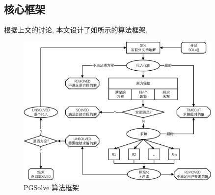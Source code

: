 \subsection{核心框架}

根据上文的讨论, 本文设计了如所示的算法框架. 

\begin{figure}[htbp]
\centering 
\includegraphics[width=0.9\textwidth]{fig/pgsolve.pdf}
\caption{PGSolve 算法框架}\label{PGSolve}
\end{figure}

